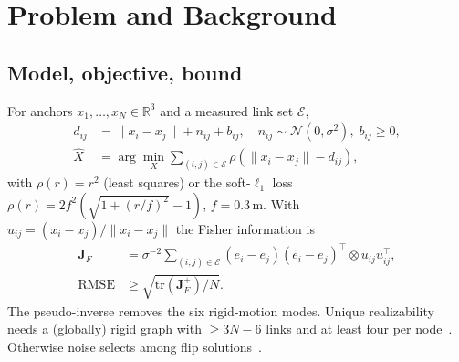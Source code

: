 \documentclass[10pt,a4paper,twocolumn]{extarticle}
\begin{document}
\section{Problem and Background}
\subsection{Model, objective, bound}
For anchors $x_1,\dots,x_N\in\mathbb{R}^3$ and a measured link set $\mathcal{E}$,
\begin{align}
d_{ij} &= \lVert x_i-x_j\rVert + n_{ij} + b_{ij},\quad n_{ij}\sim\mathcal{N}(0,\sigma^2),\; b_{ij}\ge 0, \label{eq:model}\\
\hat X &= \arg\min_X \sum_{(i,j)\in\mathcal{E}} \rho\!\left(\lVert x_i-x_j\rVert - d_{ij}\right), \label{eq:obj}
\end{align}
with $\rho(r)=r^2$ (least squares) or the soft-$\ell_1$ loss $\rho(r)=2f^2(\sqrt{1+(r/f)^2}-1)$, $f=0.3$\,m. With
$u_{ij}=(x_i-x_j)/\lVert x_i-x_j\rVert$ the Fisher information is
\begin{align}
\mathbf{J}_F&=\sigma^{-2}\!\!\sum_{(i,j)\in\mathcal{E}}\!(e_i-e_j)(e_i-e_j)^{\top}\!\otimes u_{ij}u_{ij}^{\top},\nonumber\\
\mathrm{RMSE}&\ge\sqrt{\mathrm{tr}(\mathbf{J}_F^{+})/N}. \label{eq:crb}
\end{align}
The pseudo-inverse removes the six rigid-motion modes. Unique realizability needs a (globally) rigid graph with $\ge 3N{-}6$ links and at
least four per node~\cite{aspnes2006,hendrickson1992}. Otherwise noise selects among flip solutions~\cite{moore2004}.



\end{document}
